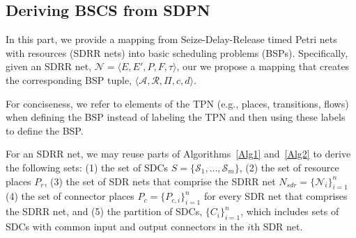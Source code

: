 \subsection{Deriving BSCS from SDPN}

In this part, we provide a 
mapping from Seize-Delay-Release 
timed Petri nets with resources (SDRR nets) into 
basic scheduling problems (BSPs). Specifically, 
given an SDRR net, $\mathcal{N} = \langle E, E',P, F, \tau \rangle$, our
we propose a mapping  that creates the corresponding BSP tuple, $\langle  \mathcal{A}, \mathcal{R},\varPi, c, d \rangle$.

For conciseness, 
we refer to elements of the TPN 
(e.g., places, transitions, flows)
when defining the BSP instead of labeling the TPN
and then using these labels to define the BSP. 

For an SDRR net, we may reuse parts of
Algorithms~\ref{Alg1} and~\ref{Alg2} to derive the following
sets: (1) the set of SDCs $S = \{\mathcal{S}_1,\ldots,\mathcal{S}_m\}$,
(2) the set of resource places $P_r$, (3) 
the set of SDR nets that comprise the 
SDRR net $N_{sdr} = \{\mathcal{N}_i\}_{i=1}^{n}$ (4) the set of 
connector places $P_c = \{P_{c,i}\}_{i=1}^{n}$ for every SDR net
that comprises the SDRR net, and (5) the 
partition of SDCs, $\{C_i\}_{i=1}^{n}$, 
which includes sets of SDCs with common 
input and output connectors in the $i$th SDR net. 

